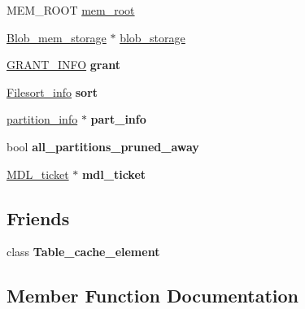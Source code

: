 \begin{DoxyCompactItemize}
\begin{tabbing}
\end{tabbing}\item 
M\+E\+M\+\_\+\+R\+O\+OT \mbox{\hyperlink{structTABLE_aa76fd5e13a8b5101a247413701978730}{mem\+\_\+root}}
\item 
\mbox{\hyperlink{classBlob__mem__storage}{Blob\+\_\+mem\+\_\+storage}} $\ast$ \mbox{\hyperlink{structTABLE_ae97224c2b47679281629de05a4155a71}{blob\+\_\+storage}}
\item 
\mbox{\label{structTABLE_adc88a409c13b2f237761fd9952bb6a5f}} 
\mbox{\hyperlink{structGRANT__INFO}{G\+R\+A\+N\+T\+\_\+\+I\+N\+FO}} {\bfseries grant}
\item 
\mbox{\label{structTABLE_a10250db5c43170e27fe3c4467b6d5bb5}} 
\mbox{\hyperlink{classFilesort__info}{Filesort\+\_\+info}} {\bfseries sort}
\item 
\mbox{\label{structTABLE_a0b6463a858185a43b8b6693854ced600}} 
\mbox{\hyperlink{classpartition__info}{partition\+\_\+info}} $\ast$ {\bfseries part\+\_\+info}
\item 
\mbox{\label{structTABLE_aae53cc4b6ac27afa0bc807c51312620b}} 
bool {\bfseries all\+\_\+partitions\+\_\+pruned\+\_\+away}
\item 
\mbox{\label{structTABLE_aacdbd7b3d2bd42afc1ff0c3dcf6c57f4}} 
\mbox{\hyperlink{classMDL__ticket}{M\+D\+L\+\_\+ticket}} $\ast$ {\bfseries mdl\+\_\+ticket}
\end{DoxyCompactItemize}
\subsection*{Friends}
\begin{DoxyCompactItemize}
\item 
\mbox{\label{structTABLE_a49b28bfe60a1eb8b9230573472166d12}} 
class {\bfseries Table\+\_\+cache\+\_\+element}
\end{DoxyCompactItemize}


\subsection{Member Function Documentation}
\mbox{\label{structTABLE_ad78429d129e0432b21bfdb41c05f928a}} 
